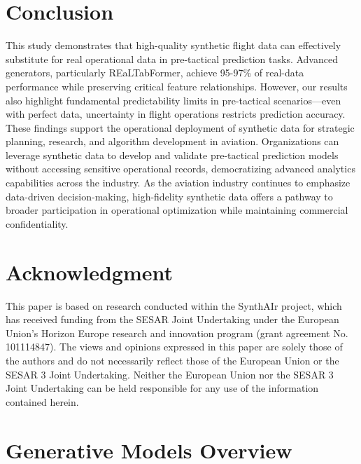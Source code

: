 \documentclass[conference]{IEEEtran}
\begin{document}
\section{Conclusion}

This study demonstrates that high-quality synthetic flight data can effectively substitute for real operational data in pre-tactical prediction tasks. Advanced generators, particularly REaLTabFormer, achieve 95-97\% of real-data performance while preserving critical feature relationships. However, our results also highlight fundamental predictability limits in pre-tactical scenarios—even with perfect data, uncertainty in flight operations restricts prediction accuracy.
These findings support the operational deployment of synthetic data for strategic planning, research, and algorithm development in aviation. Organizations can leverage synthetic data to develop and validate pre-tactical prediction models without accessing sensitive operational records, democratizing advanced analytics capabilities across the industry. As the aviation industry continues to emphasize data-driven decision-making, high-fidelity synthetic data offers a pathway to broader participation in operational optimization while maintaining commercial confidentiality.


\section*{Acknowledgment}

This paper is based on research conducted within the SynthAIr project, which has received funding from the SESAR Joint Undertaking under the European Union’s Horizon Europe research and innovation program (grant agreement No. 101114847). The views and opinions expressed in this paper are solely those of the authors and do not necessarily reflect those of the European Union or the SESAR 3 Joint Undertaking. Neither the European Union nor the SESAR 3 Joint Undertaking can be held responsible for any use of the information contained herein.


\balance







\appendices
\section{Generative Models Overview}
\label{sec:appendix-generative_models}
\end{document}
